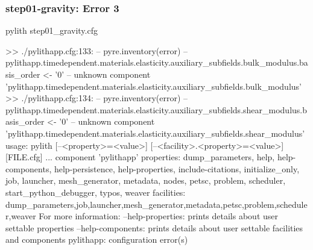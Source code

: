 \documentclass[aspectratio=169]{beamer}
\begin{document}
\begin{frame}[fragile]
  \frametitle{{\ttfamily step01-gravity}: Error 3}

\begin{bashcode}
pylith step01_gravity.cfg

 >> ./pylithapp.cfg:133:
 -- pyre.inventory(error)
 -- pylithapp.timedependent.materials.elasticity.auxiliary_subfields.bulk_modulus.basis_order <- '0'
 -- unknown component 'pylithapp.timedependent.materials.elasticity.auxiliary_subfields.bulk_modulus'
 >> ./pylithapp.cfg:134:
 -- pyre.inventory(error)
 -- pylithapp.timedependent.materials.elasticity.auxiliary_subfields.shear_modulus.basis_order <- '0'
 -- unknown component 'pylithapp.timedependent.materials.elasticity.auxiliary_subfields.shear_modulus'
usage: pylith [--<property>=<value>] [--<facility>.<property>=<value>] [FILE.cfg] ...
component 'pylithapp'
    properties: dump_parameters, help, help-components, help-persistence, help-properties, include-citations, initialize_only, job, launcher, mesh_generator, metadata, nodes, petsc, problem, scheduler, start_python_debugger, typos, weaver
    facilities: dump_parameters,job,launcher,mesh_generator,metadata,petsc,problem,scheduler,weaver
For more information:
  --help-properties: prints details about user settable properties
  --help-components: prints details about user settable facilities and components
pylithapp: configuration error(s)
\end{bashcode}

\end{frame}
\end{document}
